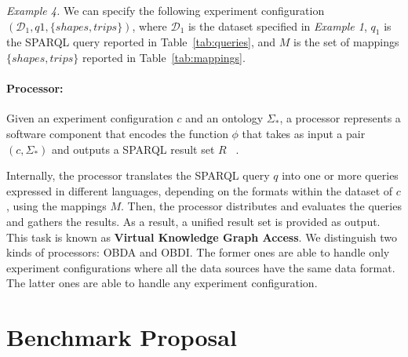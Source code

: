 \textit{Example 4.} We can specify the following experiment configuration $(\mathcal{D}_{1}, q1, \{shapes, trips\})$, where $\mathcal{D}_{1}$ is the data\-set specified in \textit{Example 1}, $q_1$ is the SPARQL query reported in Table~\ref{tab:queries}, 
and $M$ is the set of mappings $\{shapes, trips\}$  reported in Table~\ref{tab:mappings}.

\paragraph{\textbf{Processor:}} Given an experiment configuration $c$ and an ontology $\Sigma_*$, a processor represents a software component that encodes the function $\phi$ that takes as input a pair  $(c,\Sigma_*)$ and outputs a SPARQL result set $R$ ~\citep{w3c2013sparql}. 

Internally, the processor translates the SPARQL query $q$ into one or more queries expressed in different languages, depending on the formats within the dataset of $c$, using the mappings $M$. Then, the processor distributes and evaluates the queries and gathers the results. As a result, a unified result set is provided as output. This task is known as \textbf{Virtual Knowledge Graph Access}. We distinguish two kinds of processors: OBDA and OBDI. The former ones are able to handle only experiment configurations where all the data sources have the same data format. The latter ones are able to handle any experiment configuration.



\section{Benchmark Proposal}

